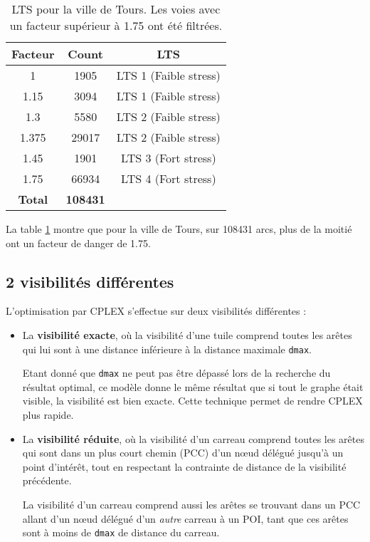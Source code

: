 \documentclass[a4paper,12pt,twoside,french]{article}
\begin{document}
\begin{table}[h]
\centering
\caption{LTS pour la ville de Tours. Les voies avec un facteur supérieur à 1.75 ont été filtrées.}
\vspace{0.5cm}
\begin{tabular}{|c|c|c|}
\hline
\textbf{Facteur} & \textbf{Count} & \textbf{LTS} \\
\hline
1 & 1905 & LTS 1 (Faible stress) \\
1.15 &3094 &LTS 1 (Faible stress)\\
1.3 &5580 &LTS 2 (Faible stress)\\
1.375& 29017& LTS 2 (Faible stress)\\
1.45 &1901 &LTS 3 (Fort stress)\\
1.75 &66934 &LTS 4 (Fort stress)\\
 \hline 
 \textbf{Total} & \textbf{108431} & \\
 \hline 
 \end{tabular}
\label{table:lts_tours}
\end{table}

La table \ref{table:lts_tours} montre que pour la ville de Tours, sur 108431 arcs, plus de la moitié ont un facteur de danger de 1.75. 

\subsection{2 visibilités différentes}

L'optimisation par CPLEX s'effectue sur deux visibilités différentes : 

\begin{itemize}
    \item La \textbf{visibilité exacte}, où la visibilité d'une tuile comprend toutes les arêtes qui lui sont à une distance inférieure à la distance maximale \texttt{dmax}.

    Etant donné que \texttt{dmax} ne peut pas être dépassé lors de la recherche du résultat optimal, ce modèle donne le même résultat que si tout le graphe était visible, la visibilité est bien exacte. Cette technique permet de rendre CPLEX plus rapide. 

    \item La \textbf{visibilité réduite}, où la visibilité d'un carreau comprend toutes les arêtes qui sont dans un plus court chemin (PCC) d'un nœud délégué jusqu'à un point d'intérêt, tout en respectant la contrainte de distance de la visibilité précédente.

    La visibilité d'un carreau comprend aussi les arêtes se trouvant dans un PCC allant d'un nœud délégué d'un \textit{autre} carreau à un POI, tant que ces arêtes sont à moins de \texttt{dmax} de distance du carreau.
\end{itemize} 
\end{document}
